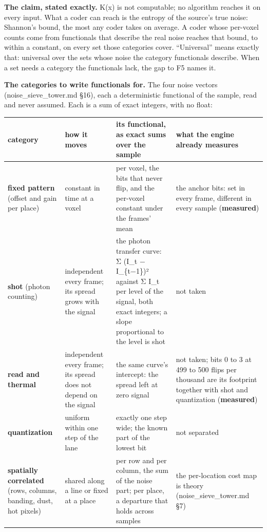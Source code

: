 \textbf{The claim, stated exactly.} K(x) is not computable; no algorithm reaches it on every input. What a coder can reach is the entropy of the source's true noise: Shannon's bound, the most any coder takes on average. A coder whose per-voxel counts come from functionals that describe the real noise reaches that bound, to within a constant, on every set those categories cover. “Universal” means exactly that: universal over the sets whose noise the category functionals describe. When a set needs a category the functionals lack, the gap to F5 names it.

\textbf{The categories to write functionals for.} The four noise vectors (noise\_\allowbreak{}sieve\_\allowbreak{}tower.md §16), each a deterministic functional of the sample, read and never assumed. Each is a sum of exact integers, with no float:

{\footnotesize
\setlength{\tabcolsep}{6pt}
\begin{longtable}{>{\RaggedRight\arraybackslash}p{}>{\RaggedRight\arraybackslash}p{}>{\RaggedRight\arraybackslash}p{}>{\RaggedRight\arraybackslash}p{}}
\toprule
category & how it moves & its functional, as exact sums over the sample & what the engine already measures \\
\midrule
\endhead
\textbf{fixed pattern} (offset and gain per place) & constant in time at a voxel & per voxel, the bits that never flip, and the per-voxel constant under the frames' mean & the anchor bits: set in every frame, different in every sample (\textbf{measured}) \\
\textbf{shot} (photon counting) & independent every frame; its spread grows with the signal & the photon transfer curve: Σ (I\_\allowbreak{}t − I\_\allowbreak{}\{t−1\})² against Σ I\_\allowbreak{}t per level of the signal, both exact integers; a slope proportional to the level is shot & not taken \\
\textbf{read and thermal} & independent every frame; its spread does not depend on the signal & the same curve's intercept: the spread left at zero signal & not taken; bits 0 to 3 at 499 to 500 flips per thousand are its footprint together with shot and quantization (\textbf{measured}) \\
\textbf{quantization} & uniform within one step of the lane & exactly one step wide; the known part of the lowest bit & not separated \\
\textbf{spatially correlated} (rows, columns, banding, dust, hot pixels) & shared along a line or fixed at a place & per row and per column, the sum of the noise part; per place, a departure that holds across samples & the per-location cost map is theory (noise\_\allowbreak{}sieve\_\allowbreak{}tower.md §7) \\
\bottomrule
\end{longtable}
}

